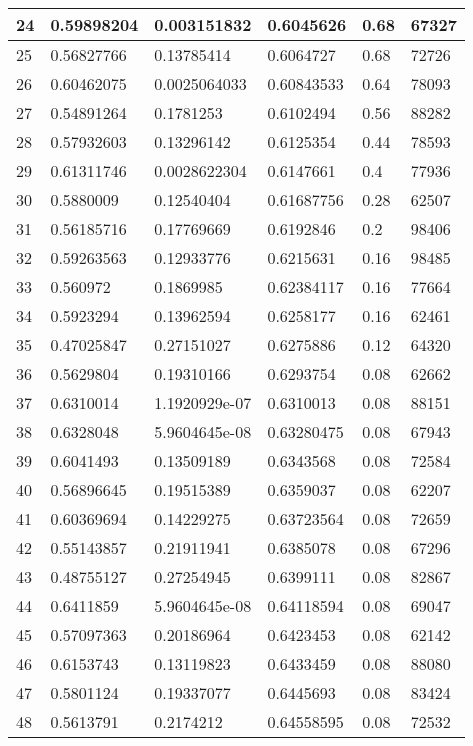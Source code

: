 \begin{longtable}{|l|l|l|l|l|l|}
24 & 0.59898204 & 0.003151832 & 0.6045626 & 0.68 & 67327 \\ \hline 
25 & 0.56827766 & 0.13785414 & 0.6064727 & 0.68 & 72726 \\ \hline 
26 & 0.60462075 & 0.0025064033 & 0.60843533 & 0.64 & 78093 \\ \hline 
27 & 0.54891264 & 0.1781253 & 0.6102494 & 0.56 & 88282 \\ \hline 
28 & 0.57932603 & 0.13296142 & 0.6125354 & 0.44 & 78593 \\ \hline 
29 & 0.61311746 & 0.0028622304 & 0.6147661 & 0.4 & 77936 \\ \hline 
30 & 0.5880009 & 0.12540404 & 0.61687756 & 0.28 & 62507 \\ \hline 
31 & 0.56185716 & 0.17769669 & 0.6192846 & 0.2 & 98406 \\ \hline 
32 & 0.59263563 & 0.12933776 & 0.6215631 & 0.16 & 98485 \\ \hline 
33 & 0.560972 & 0.1869985 & 0.62384117 & 0.16 & 77664 \\ \hline 
34 & 0.5923294 & 0.13962594 & 0.6258177 & 0.16 & 62461 \\ \hline 
35 & 0.47025847 & 0.27151027 & 0.6275886 & 0.12 & 64320 \\ \hline 
36 & 0.5629804 & 0.19310166 & 0.6293754 & 0.08 & 62662 \\ \hline 
37 & 0.6310014 & 1.1920929e-07 & 0.6310013 & 0.08 & 88151 \\ \hline 
38 & 0.6328048 & 5.9604645e-08 & 0.63280475 & 0.08 & 67943 \\ \hline 
39 & 0.6041493 & 0.13509189 & 0.6343568 & 0.08 & 72584 \\ \hline 
40 & 0.56896645 & 0.19515389 & 0.6359037 & 0.08 & 62207 \\ \hline 
41 & 0.60369694 & 0.14229275 & 0.63723564 & 0.08 & 72659 \\ \hline 
42 & 0.55143857 & 0.21911941 & 0.6385078 & 0.08 & 67296 \\ \hline 
43 & 0.48755127 & 0.27254945 & 0.6399111 & 0.08 & 82867 \\ \hline 
44 & 0.6411859 & 5.9604645e-08 & 0.64118594 & 0.08 & 69047 \\ \hline 
45 & 0.57097363 & 0.20186964 & 0.6423453 & 0.08 & 62142 \\ \hline 
46 & 0.6153743 & 0.13119823 & 0.6433459 & 0.08 & 88080 \\ \hline 
47 & 0.5801124 & 0.19337077 & 0.6445693 & 0.08 & 83424 \\ \hline 
48 & 0.5613791 & 0.2174212 & 0.64558595 & 0.08 & 72532 \\ \hline 

\end{longtable}
